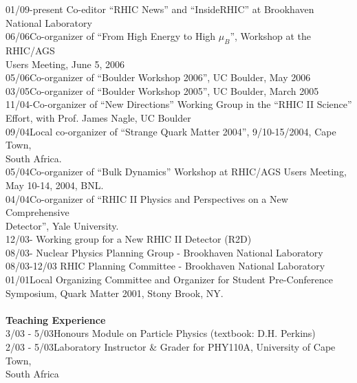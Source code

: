 \documentclass[11 pt]{article}
\begin{document}
\begin{tabbing}
01/09-present\> Co-editor ``RHIC News'' and ``InsideRHIC'' at Brookhaven National Laboratory\\
06/06\>Co-organizer of ``From High Energy to High $\mu_B$'', Workshop at the RHIC/AGS\\
\>Users Meeting, June 5, 2006\\
05/06\>Co-organizer of ``Boulder Workshop 2006'', UC Boulder, May 2006\\
03/05\>Co-organizer of ``Boulder Workshop 2005'', UC Boulder, March 2005\\
11/04-\>Co-organizer of ``New Directions'' Working Group in the ``RHIC II Science''\\\> Effort, with Prof. James Nagle, UC Boulder\\
09/04\>Local co-organizer of ``Strange Quark Matter 2004'', 9/10-15/2004, Cape Town,\\ 
\>South Africa.\\
05/04\>Co-organizer of ``Bulk Dynamics'' Workshop at RHIC/AGS Users Meeting, \\
\>May 10-14, 2004, BNL.\\
04/04\>Co-organizer of ``RHIC II Physics and Perspectives on a New Comprehensive\\
\>Detector'', Yale University.\\
12/03-\> Working group for a New RHIC II Detector (R2D)\\
08/03-\> Nuclear Physics Planning Group - Brookhaven National Laboratory \\
08/03-12/03\> RHIC Planning Committee - Brookhaven National Laboratory \\ 
01/01\>Local Organizing Committee and Organizer for Student Pre-Conference \\
\>Symposium, Quark Matter 2001, Stony Brook, NY.\\
\\
\textbf{Teaching Experience}\\
3/03 - 5/03\>Honours Module on Particle Physics (textbook: D.H. Perkins)\\
2/03 - 5/03\>Laboratory Instructor \& Grader for PHY110A, University of Cape Town,\\
\>South Africa \\
\end{tabbing}
\end{document}
